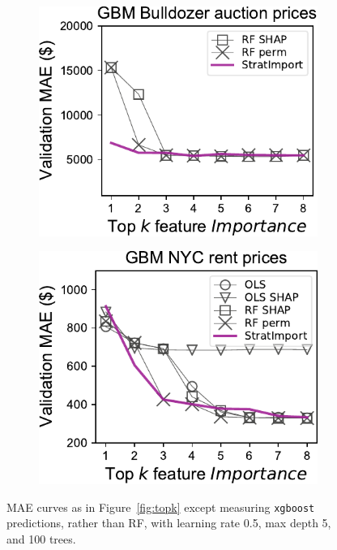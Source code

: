 \documentclass[11pt]{article}
\newcommand{\figref}[1]{Figure~\ref{#1}}
\begin{document}
\begin{figure}
\begin{subfigure}{.245\textwidth}
\includegraphics[scale=0.45]{images/bulldozer-topk-GBM-Importance.pdf}
\subcaption{}
\end{subfigure}%
\hfill
\begin{subfigure}{.245\textwidth}
    \centering
\includegraphics[scale=0.45]{images/rent-topk-GBM-Importance.pdf}
\subcaption{}
\end{subfigure}
\caption[short]{\small MAE curves as in \figref{fig:topk} except measuring {\tt xgboost} predictions, rather than RF, with learning rate 0.5,  max depth 5, and 100 trees.}
\label{fig:topk-gbm}
\end{figure}
\end{document}
